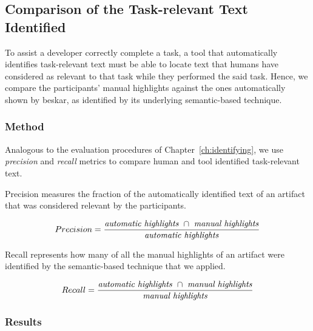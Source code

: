 \clearpage


\subsection{Comparison of the Task-relevant Text Identified}
\label{cp6:comparison}


To assist a developer correctly complete a task, a tool that
automatically identifies task-relevant text must be able to 
locate text that humans have considered as relevant to that task
while they performed the said task. 
Hence, we compare the participants' manual highlights against the ones 
automatically shown by \acs{beskar}, as 
  identified by its underlying semantic-based technique.
 





\subsubsection{Method}

Analogous to the evaluation procedures of Chapter~\ref{ch:identifying}, we use 
\textit{precision} and \textit{recall} metrics
to compare human and tool identified task-relevant text.




Precision measures the fraction of the automatically identified text of an artifact that was  considered relevant
by the participants.

\smallskip
\begin{small}


\begin{equation}
    Precision = \frac{
        \text{\textit{automatic highlights}~} \cap 
        \text{~\textit{manual highlights}}
    }{\text{\textit{automatic highlights}}}
\end{equation}
\end{small}


Recall represents how many of all the manual highlights of an artifact were identified by the semantic-based technique that we applied.

\smallskip
\begin{small}

\begin{equation}
    Recall = \frac{
        \text{\textit{automatic highlights}~} \cap 
        \text{~\textit{manual highlights}}
    }{\text{\textit{manual highlights}}}
\end{equation}
\end{small}

\medskip
{}




\subsubsection{Results}





